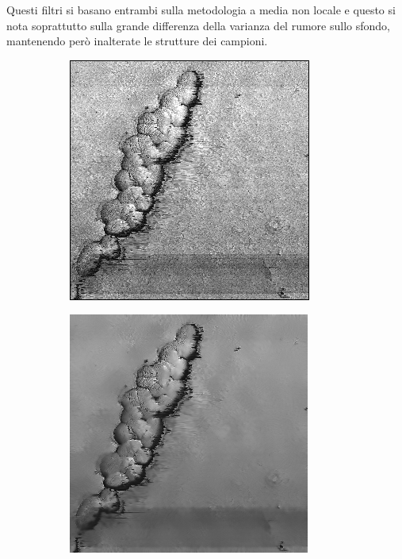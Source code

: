 \documentclass[../main.tex]{subfiles}
\begin{document}
Questi filtri si basano entrambi sulla metodologia a media non locale e questo si nota soprattutto sulla grande differenza della varianza del rumore sullo sfondo, mantenendo però inalterate le strutture dei campioni. 


\newpage
\null
\vfill
\begin{figure}[!ht]
	\centering
	\begin{subfigure}{0.3\linewidth}
		\centering
		\includegraphics[keepaspectratio, width=\linewidth]{images/ef_o2a_orig.png}
	\end{subfigure}
	\hfill
	\begin{subfigure}{0.3\linewidth}
		\centering
		\includegraphics[keepaspectratio, width=\linewidth]{images/ef_o2a_nlm.png}

\end{subfigure}
\end{figure}
\end{document}
